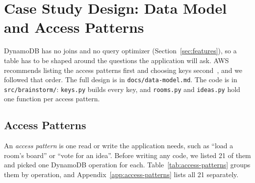 %

\section{Case Study Design: Data Model and Access Patterns}\label{sec:data-model}

DynamoDB has no joins and no query optimizer (Section~\ref{sec:features}), so a table has to be
shaped around the questions the application will ask. AWS recommends listing the access patterns
first and choosing keys second~\cite{nosql-design}, and we followed that order. The full design
is in \texttt{docs/data-model.md}. The code is in \texttt{src/brainstorm/}: \texttt{keys.py}
builds every key, and \texttt{rooms.py} and \texttt{ideas.py} hold one function per access
pattern.

\subsection{Access Patterns}\label{sec:dm-patterns}

An \emph{access pattern} is one read or write the application needs, such as ``load a room's
board'' or ``vote for an idea''. Before writing any code, we listed 21 of them and picked one
DynamoDB operation for each. Table~\ref{tab:access-patterns} groups them by operation, and
Appendix~\ref{app:access-patterns} lists all 21 separately.

